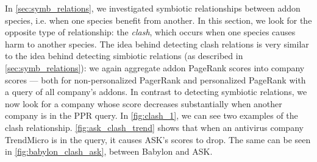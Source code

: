 \documentclass[11pt,oneside]{book}
\begin{document}
In \autoref{sec:symb_relations}, we investigated symbiotic relationships between addon species, i.e. when one species benefit from another. In this section, we look for the opposite type of relationship: the \emph{clash}, which occurs when one species causes harm to another species. The idea behind detecting clash relations is very similar to the idea behind detecting simbiotic relations (as described in \autoref{sec:symb_relations}): we again aggregate addon PageRank scores into company scores --- both for non-personalized PagerRank and personalized PageRank with a query of all company's addons. In contrast to detecting symbiotic relations, we now look for a company whose score decreases substantially when another company is in the PPR query. In \autoref{fig:clash_1}, we can see two examples of the clash relationship. \autoref{fig:ask_clash_trend} shows that when an antivirus company TrendMicro is in the query, it causes ASK's scores to drop. The same can be seen in \autoref{fig:babylon_clash_ask}, between Babylon and ASK.

\end{document}
